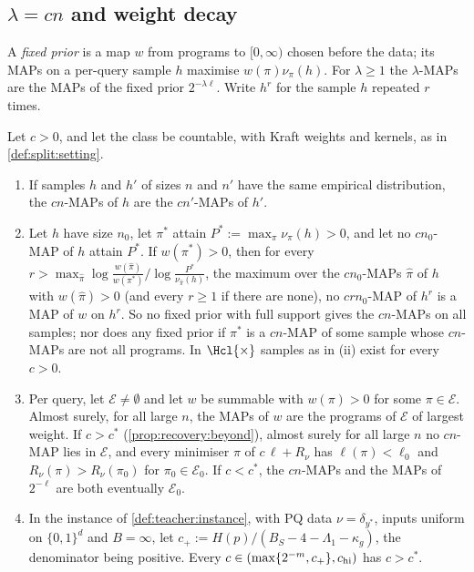 \subsection{\texorpdfstring{$\lambda=cn$}{lambda=cn} and weight decay}\label{app:teacher:weightdecay}

A \emph{fixed prior} is a map $w$ from programs to $[0,\infty)$ chosen before the data; its MAPs on a per-query sample $h$ maximise $w(\pi)\nu_\pi(h)$. For $\lambda\ge1$ the $\lambda$-MAPs are the MAPs of the fixed prior $2^{-\lambda\ell}$. Write $h^r$ for the sample $h$ repeated $r$ times.

\begin{proposition}\label{prop:teacher:nofixedprior}
Let $c>0$, and let the class be countable, with Kraft weights and kernels, as in \cref{def:split:setting}.
\begin{enumerate}[label=(\roman*),itemsep=0pt,topsep=2pt]
\item If samples $h$ and $h'$ of sizes $n$ and $n'$ have the same empirical distribution, the $cn$-MAPs of $h$ are the $cn'$-MAPs of $h'$.
\item Let $h$ have size $n_0$, let $\pi^*$ attain $P^*:=\max_\pi\nu_\pi(h)>0$, and let no $cn_0$-MAP of $h$ attain $P^*$. If $w(\pi^*)>0$, then for every $r>\max_{\hat\pi}\log\frac{w(\hat\pi)}{w(\pi^*)}\big/\log\frac{P^*}{\nu_{\hat\pi}(h)}$, the maximum over the $cn_0$-MAPs $\hat\pi$ of $h$ with $w(\hat\pi)>0$ (and every $r\ge1$ if there are none), no $crn_0$-MAP of $h^r$ is a MAP of $w$ on $h^r$. So no fixed prior with full support gives the $cn$-MAPs on all samples; nor does any fixed prior if $\pi^*$ is a $cn$-MAP of some sample whose $cn$-MAPs are not all programs. In $\Hcl{\times}$ samples as in (ii) exist for every $c>0$.
\item Per query, let $\mathcal E\ne\emptyset$ and let $w$ be summable with $w(\pi)>0$ for some $\pi\in\mathcal E$. Almost surely, for all large $n$, the MAPs of $w$ are the programs of $\mathcal E$ of largest weight. If $c>c^*$ (\cref{prop:recovery:beyond}), almost surely for all large $n$ no $cn$-MAP lies in $\mathcal E$, and every minimiser $\pi$ of $c\,\ell+R_\nu$ has $\ell(\pi)<\ell_0$ and $R_\nu(\pi)>R_\nu(\pi_0)$ for $\pi_0\in\mathcal E_0$. If $c<c^*$, the $cn$-MAPs and the MAPs of $2^{-\ell}$ are both eventually $\mathcal E_0$.
\item In the instance of \cref{def:teacher:instance}, with PQ data $\nu=\delta_{y^*}$, inputs uniform on $\{0,1\}^d$ and $B=\infty$, let $c_+:=H(p)/(B_S-4-\Lambda_1-\kappa_g)$, the denominator being positive. Every $c\in(\max\{2^{-m},c_+\},c_{\rm hi})$ has $c>c^*$.
\end{enumerate}
\end{proposition}


